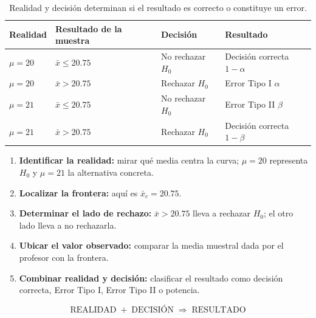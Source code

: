 \documentclass[11pt,a4paper]{article}
\begin{document}
\begin{table}[H]
\centering
\small
\renewcommand{\arraystretch}{1.3}
\begin{tabularx}{\textwidth}{>{\centering\arraybackslash}p{2.0cm}
                              >{\centering\arraybackslash}p{3.2cm}
                              >{\centering\arraybackslash}p{3.0cm}X}
\toprule
\textbf{Realidad} & \textbf{Resultado de la muestra} & \textbf{Decisión} & \textbf{Resultado}\\
\midrule
$\mu=20$ & $\bar{x}\le20.75$ & No rechazar $H_0$ & \cellcolor{acceptblue!10}Decisión correcta $1-\alpha$\\
$\mu=20$ & $\bar{x}>20.75$ & Rechazar $H_0$ & \cellcolor{rejectred!14}Error Tipo I $\alpha$\\
$\mu=21$ & $\bar{x}\le20.75$ & No rechazar $H_0$ & \cellcolor{altorange!14}Error Tipo II $\beta$\\
$\mu=21$ & $\bar{x}>20.75$ & Rechazar $H_0$ & \cellcolor{accentgreen!14}Decisión correcta $1-\beta$\\
\bottomrule
\end{tabularx}
\caption{Realidad y decisión determinan si el resultado es correcto o constituye un error.}
\end{table}

\begin{tcolorbox}[
  colback=softgray,colframe=black!55,
  title=\textbf{Regla para leer el gráfico},
  fonttitle=\bfseries,arc=1mm,boxrule=.7pt]
\begin{enumerate}[label=\textbf{\arabic*.},leftmargin=1.8em]
\item \textbf{Identificar la realidad:} mirar qué media centra la curva; $\mu=20$ representa $H_0$ y $\mu=21$ la alternativa concreta.
\item \textbf{Localizar la frontera:} aquí es $\bar{x}_c=20.75$.
\item \textbf{Determinar el lado de rechazo:} $\bar{x}>20.75$ lleva a rechazar $H_0$; el otro lado lleva a no rechazarla.
\item \textbf{Ubicar el valor observado:} comparar la media muestral dada por el profesor con la frontera.
\item \textbf{Combinar realidad y decisión:} clasificar el resultado como decisión correcta, Error Tipo I, Error Tipo II o potencia.
\end{enumerate}
\[
\boxed{\text{REALIDAD}}
\; + \;
\boxed{\text{DECISIÓN}}
\;\Rightarrow\;
\boxed{\text{RESULTADO}}
\]
\end{tcolorbox}
\end{document}
